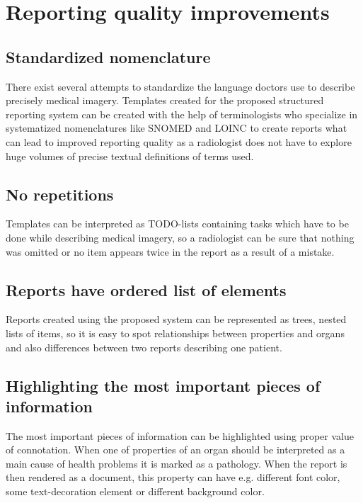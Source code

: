 \documentclass[12pt, twoside, openany]{report}
\theoremstyle{definition}
\begin{document}
\section{Reporting quality improvements}
\subsection{Standardized nomenclature}
There exist several attempts to standardize the language doctors use to describe precisely medical imagery. Templates created for the proposed structured reporting system can be created with the help of terminologists who specialize in systematized nomenclatures like SNOMED and LOINC to create reports what can lead to improved reporting quality as a radiologist does not have to explore huge volumes of precise textual definitions of terms used. 
\subsection{No repetitions}
Templates can be interpreted as TODO-lists containing tasks which have to be done while describing medical imagery, so a radiologist can be sure that nothing was omitted or no item appears twice in the report as a result of a mistake.
\subsection{Reports have ordered list of elements}
Reports created using the proposed system can be represented as trees, nested lists of items, so it is easy to spot relationships between properties and organs and also differences between two reports describing one patient.
\subsection{Highlighting the most important pieces of information}
The most important pieces of information can be highlighted using proper value of connotation. When one of properties of an organ should be interpreted as a main cause of health problems it is marked as a pathology. When the report is then rendered as a document, this property can have e.g. different font color, some text-decoration element or different background color.
\end{document}
